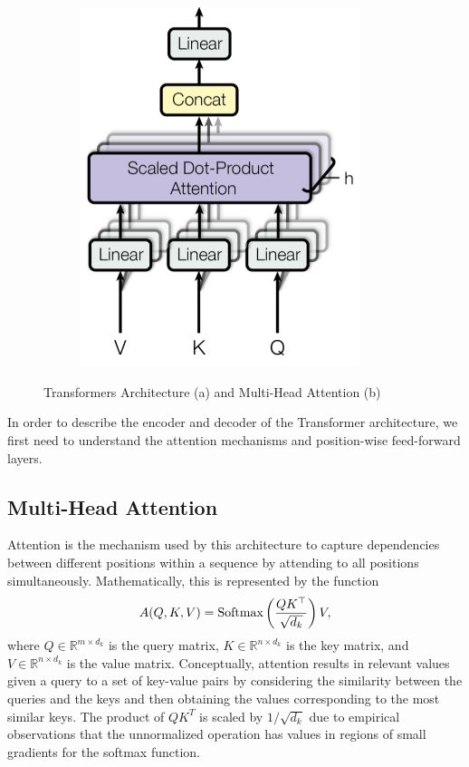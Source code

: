 \begin{figure}[h]
\begin{subfigure}[b]{0.4\textwidth}
    \includegraphics[width=0.9\textwidth]{images/multi-head.png}
    \caption{}
    \label{fig:multi-head}
\end{subfigure}
\caption{Transformers Architecture (a) and Multi-Head Attention (b) \cite{vaswani2023attention}}
\end{figure}

In order to describe the encoder and decoder of the Transformer architecture, we first need to understand the attention mechanisms and position-wise feed-forward layers.

\subsection{Multi-Head Attention}

Attention is the mechanism used by this architecture to capture dependencies between different positions within a sequence by attending to all positions simultaneously. Mathematically, this is represented by the function 
\begin{equation}
    A(Q, K, V) = \text{Softmax}\left(\frac{QK^\top}{\sqrt{d_k}}\right) V,
\end{equation}
where $Q \in \mathbb{R}^{m \times d_k}$ is the query matrix, $K \in \mathbb{R}^{n\times d_k}$ is the key matrix, and $V \in \mathbb{R}^{n \times d_k}$ is the value matrix. Conceptually, attention results in relevant values given a query to a set of key-value pairs by considering the similarity between the queries and the keys and then obtaining the values corresponding to the most similar keys. The product of $QK^T$ is scaled by $1/\sqrt{d_k}$ due to empirical observations that the unnormalized operation has values in regions of small gradients for the softmax function.

